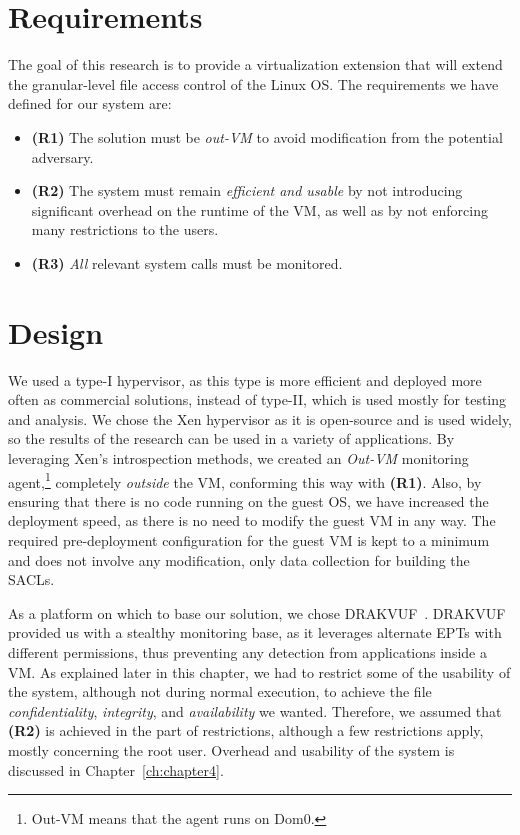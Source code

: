 \section{Requirements}\label{sec:requirements}
The goal of this research is to provide a virtualization extension that will extend the granular-level file access control of the Linux \ac{OS}. The requirements we have defined for our system are:
\begin{itemize}
	\item \textbf{(R1)} The solution must be \emph{out-\ac{VM}} to avoid modification from the potential adversary. 
	\item \textbf{(R2)} The system must remain \emph{efficient and usable} by not introducing significant overhead on the runtime of the \ac{VM}, as well as by not enforcing many restrictions to the users. 
	\item \textbf{(R3)} \emph{All} relevant system calls must be monitored.
\end{itemize}


\section{Design}\label{sec:design}

\par We used a type-I hypervisor, as this type is more efficient and deployed more often as commercial solutions, instead of type-II, which is used mostly for testing and analysis. We chose the Xen hypervisor as it is open-source and is used widely, so the results of the research can be used in a variety of applications. By leveraging Xen's introspection methods, we created an \emph{Out-\ac{VM}} monitoring agent,\footnote{Out-\ac{VM} means that the agent runs on Dom0.} completely \emph{outside} the \ac{VM}, conforming this way with \textbf{(R1)}. Also, by ensuring that there is no code running on the guest \ac{OS}, we have increased the deployment speed, as there is no need to modify the guest \ac{VM} in any way. The required pre-deployment configuration for the guest \ac{VM} is kept to a minimum and does not involve any modification, only data collection for building the \acp{SACL}.

\par As a platform on which to base our solution, we chose DRAKVUF~\cite{lengyel2014drakvuf}. DRAKVUF provided us with a stealthy monitoring base, as it leverages alternate \ac{EPT}s with different permissions, thus preventing any detection from applications inside a \ac{VM}. As explained later in this chapter, we had to restrict some of the usability of the system, although not during normal execution, to achieve the file \emph{confidentiality}, \emph{integrity}, and \emph{availability} we wanted. Therefore, we assumed that \textbf{(R2)} is achieved in the part of restrictions, although a few restrictions apply, mostly concerning the root user. Overhead and usability of the system is discussed in Chapter~\ref{ch:chapter4}.

